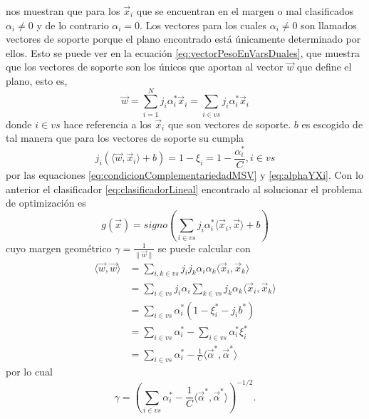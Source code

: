 \documentclass[letterpaper,12pt]{book}
\begin{document}
nos muestran que para los $\vec{x}_i$ que se encuentran en el margen o mal clasificados $\alpha_i\neq 0$ y de lo contrario $\alpha_i = 0$. Los vectores para los cuales $\alpha_i\neq 0$ son llamados vectores de soporte porque el plano encontrado está únicamente determinado por ellos. Esto se puede ver en la ecuación \ref{eq:vectorPesoEnVarsDuales}, que muestra que los vectores de soporte son los únicos que aportan al vector $\vec{w}$ que define el plano, esto es, 
\begin{equation}
\vec{w} = \sum_{i=1}^{N}j_i\alpha_i^*\vec{x}_i = \sum_{i\in vs}j_i\alpha_i^*\vec{x}_i
\end{equation}
donde $i\in vs$ hace referencia a los $\vec{x}_i$ que son vectores de soporte. $b$ es escogido de tal manera que para los vectores de soporte su cumpla  
\begin{equation}\label{eq:eleccionb}
  j_i(\langle\vec{w},\vec{x}_i\rangle+b) = 1-\xi_i = 1-\frac{\alpha_i^*}{C}, i\in vs
\end{equation}
por las equaciones \ref{eq:condicionComplementariedadMSV} y \ref{eq:alphaYXi}. Con lo anterior el clasificador \ref{eq:clasificadorLineal} encontrado al solucionar el problema de optimización es 
\begin{equation}\label{eq:clasificadorMargenMaximal}
g(\vec{x}) = signo\left(\sum_{i\in vs}j_i\alpha^*_i\langle\vec{x}_i,\vec{x}\rangle + b \right)
\end{equation}
cuyo margen geométrico $\gamma = \frac{1}{\| \vec{w} \|}$ se puede calcular con
\begin{equation}
  \begin{aligned}
    \langle\vec{w},\vec{w}\rangle &= \sum_{i,k\in vs}j_ij_k\alpha_i\alpha_k\langle\vec{x}_i,\vec{x}_k\rangle\\
    &= \sum_{i\in vs}j_i\alpha_i\sum_{k\in vs}j_k\alpha_k\langle\vec{x}_i,\vec{x}_k\rangle\\
    &= \sum_{i\in vs}\alpha_{i}^{*}(1-\xi_i^*-j_ib^*)\\
    &=  \sum_{i\in vs}\alpha_i^*-\sum_{i\in vs}\alpha^*_i\xi_i^*\\
    &= \sum_{i\in vs}\alpha_i^*-\frac{1}{C}\langle\vec{\alpha}^*,\vec{\alpha}^*\rangle
  \end{aligned}
\end{equation} 
por lo cual 
\begin{equation}\label{eq:margenGeometrico}
\gamma = \left(\sum_{i\in vs}\alpha_i^*-\frac{1}{C}\langle\vec{\alpha}^*,\vec{\alpha}^*\rangle\right)^{-1/2}.
\end{equation}
\end{document}
